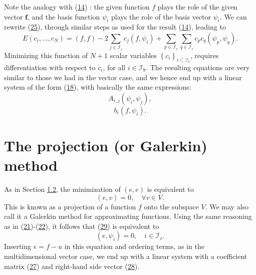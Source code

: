 \documentclass[../main.tex]{subfiles}
\begin{document}
	\noindent Note the analogy with (\hyperref[eqa14]{14}) : the given function $f$ plays the role of the given vector $\boldsymbol{f}$, and the basis function $\psi_{i}$ plays the role of the basis vector $\psi_{i}$. We can rewrite (\hyperref[eqa25]{25}), through similar steps as used for the result (\hyperref[eqa14]{14}), leading to 
	\begin{equation}\label{eqa26}
		E\left(c_{i}, \ldots, c_{N}\right)=(f, f)-2 \sum_{j \in \mathcal{I}_{s}} c_{j}\left(f, \psi_{i}\right)+\sum_{p \in \mathcal{I}_{s}} \sum_{q \in \mathcal{I}_{s}} c_{p} c_{q}\left(\psi_{p}, \psi_{q}\right).	
	\end{equation}
	Minimizing this function of $N+1$ scalar variables $\left\{c_{i}\right\}_{i \subset \mathcal{I}_{\mathrm{s}}}$, requires differentiation with respect to $c_{i}$, for all $i \in \mathcal{I}_{8}$. The resulting cquations are very similar to those we had in the vector case, and we hence end up with a linear system of the form (\hyperref[eqa18]{18}), with basically the same expressions:
	\begin{equation}\label{eqa27}
		A_{i, j} \left(\psi_{i}, \psi_{j}\right),
	\end{equation}
	\begin{equation}\label{eqa28}
		b_{i} \left(f, \psi_{i}\right).
	\end{equation}
	\section[The projection (or Galerkin) method]{The projection (or Galerkin) method}
	\label{sec:sec_2_2}
	As in Section \hyperref[sec:sec_1_2]{1.2}, the minimization of $(e, e)$ is equivalent to
	\begin{equation}\label{eqa29}
		(e, v)=0, \quad \forall v \in V.
	\end{equation}
	This is known as a projection of a function $f$ onto the subspace $V$. We may also call it a Galerkin method for approximating functions. Using the same reasoning as in (\hyperref[eqa21]{21})-(\hyperref[eqa22]{22}), it follows that (\hyperref[eqa29]{29}) is equivalent to
	\begin{equation}\label{eqa30}
		\left(e, \psi_{i}\right)=0, \quad i \in \mathcal{I}_{s}.
	\end{equation}
	Inserting $e=f-u$ in this equation and ordering terms, as in the multidimensional vector case, we end up with a linear system with a coefficient matrix (\hyperref[eqa27]{27}) and right-hand side vector (\hyperref[eqa28]{28}).
	
\end{document}

